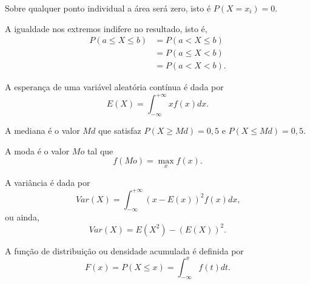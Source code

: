 \begin{remark}
	Sobre qualquer ponto individual a área será zero, isto é $P(X=x_i)=0$.
\end{remark}

\begin{remark}
	A igualdade nos extremos indifere no resultado, isto é,
	\begin{align*}
		P(a\leqslant X \leqslant b) &= P(a < X \leqslant b)\\
							  		 &=P(a\leqslant X < b)\\
									 &=P(a<X<b)\text{.}
	\end{align*}
\end{remark}

\begin{definition}
	A esperança de uma variável aleatória contínua é dada por
	\begin{equation}
		E(X)=\int_{-\infty}^{+\infty} xf(x)dx
		\text{.}
	\end{equation}
\end{definition}

\begin{definition}
	A mediana é o valor $Md$ que satisfaz $P(X\geqslant Md)=0,5$ e $P(X\leqslant Md)=0,5$.
\end{definition}

\begin{definition}
	A moda é o valor $Mo$ tal que
	\begin{equation}
		f(Mo)=\max_x f(x)
		\text{.}
	\end{equation}
\end{definition}

\begin{definition}
	A variância é dada por
	\begin{equation}
		Var(X)=\int_{-\infty}^{+\infty} (x-E(x))^2 f(x) dx
		\text{,}
	\end{equation}
	ou ainda,
	\begin{equation}
		Var(X)=E(X^2)-(E(X))^2
		\text{.}
	\end{equation}
\end{definition}

\begin{definition}
	A função de distribuição ou densidade acumulada é definida por
	\begin{equation}
		F(x)=P(X\leqslant x)=\int_{-\infty}^{x} f(t)dt
		\text{.}
	\end{equation}
\end{definition}

